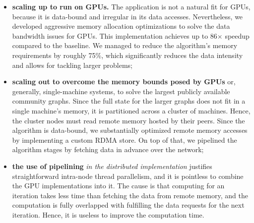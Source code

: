 \begin{itemize}
\item \textbf{scaling up to run on GPUs.}
The application is not a natural fit for GPUs, because it is data-bound and
irregular in its data accesses. Nevertheless, we developed aggressive
memory allocation optimizations to solve the data bandwidth issues for GPUs.
This implementation achieves up to 86$\times$ speedup compared to the baseline.
%
We managed to reduce the algorithm's memory requirements by roughly 75\%, which
significantly reduces the data intensity and allows for tackling larger
problems; %

\item \textbf{scaling out to overcome the memory bounds posed by GPUs} or,
generally, single-machine systems, to solve the largest publicly available
community graphs. %
Since the full state for the larger graphs does not fit in a
single machine's memory, it is partitioned across a cluster
of machines. Hence, the cluster nodes must read
remote memory hosted by their peers. Since the algorithm is data-bound, we
substantially optimized remote memory accesses by implementing
a custom RDMA store.
On top of that, we pipelined the algorithm stages by fetching
data in advance over the network;
\begin{comment} Finally, the algorithm's computation
is effectively distributed across the cluster nodes and parallelized further
within each node by exploiting their multi-core CPUs.
\end{comment}

\item \textbf{the use of pipelining} \emph{in the distributed implementation}
justifies straightforward intra-node thread parallelism, and it is pointless
to combine the GPU implementations
into it. The cause is that computing for an iteration takes less
time than fetching the data from remote memory, and the computation is
fully overlapped with fulfilling the data requests for the next iteration.
Hence, it is useless to improve the computation time.

\end{itemize}

